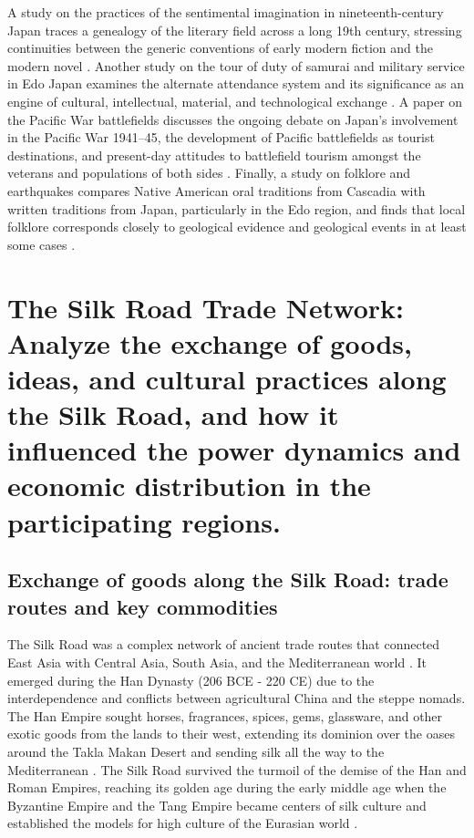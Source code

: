 \documentclass{article}
\begin{document}
A study on the practices of the sentimental imagination in nineteenth-century Japan traces a genealogy of the literary field across a long 19th century, stressing continuities between the generic conventions of early modern fiction and the modern novel \cite{Zwicker2006PracticesOT}. Another study on the tour of duty of samurai and military service in Edo Japan examines the alternate attendance system and its significance as an engine of cultural, intellectual, material, and technological exchange \cite{Vaporis2008TourOD}. A paper on the Pacific War battlefields discusses the ongoing debate on Japan's involvement in the Pacific War 1941–45, the development of Pacific battlefields as tourist destinations, and present-day attitudes to battlefield tourism amongst the veterans and populations of both sides \cite{Cooper2006ThePW}. Finally, a study on folklore and earthquakes compares Native American oral traditions from Cascadia with written traditions from Japan, particularly in the Edo region, and finds that local folklore corresponds closely to geological evidence and geological events in at least some cases \cite{Ludwin2007FolkloreAE}.


\section{The Silk Road Trade Network: Analyze the exchange of goods, ideas, and cultural practices along the Silk Road, and how it influenced the power dynamics and economic distribution in the participating regions.}

\subsection{Exchange of goods along the Silk Road: trade routes and key commodities}

The Silk Road was a complex network of ancient trade routes that connected East Asia with Central Asia, South Asia, and the Mediterranean world \cite{Liu2010TheSR}. It emerged during the Han Dynasty (206 BCE - 220 CE) due to the interdependence and conflicts between agricultural China and the steppe nomads. The Han Empire sought horses, fragrances, spices, gems, glassware, and other exotic goods from the lands to their west, extending its dominion over the oases around the Takla Makan Desert and sending silk all the way to the Mediterranean \cite{Liu2010TheSR}. The Silk Road survived the turmoil of the demise of the Han and Roman Empires, reaching its golden age during the early middle age when the Byzantine Empire and the Tang Empire became centers of silk culture and established the models for high culture of the Eurasian world \cite{Liu2010TheSR}.
\end{document}

